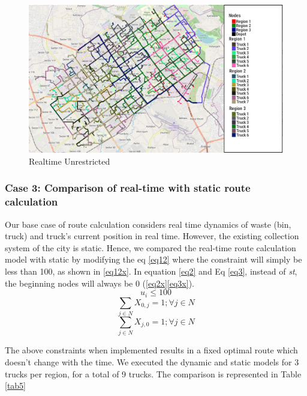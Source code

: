 \documentclass[12pt]{article}
\begin{document}
 

\begin{figure}[H]
    \centering
    \includegraphics[scale=0.4]{Dynamic_weighted_unrestricted.png} %
    \caption{Realtime Unrestricted}\label{fig2}
\end{figure}


\subsubsection*{Case 3: Comparison of real-time with static route calculation}

Our base case of route calculation considers real time dynamics of waste (bin, truck) and truck's current position in real time. However, the existing collection system of the city is static. Hence, we compared the real-time route calculation model with static by modifying the eq \eqref{eq12} where the constraint will simply be less than 100, as shown in \eqref{eq12x}. In equation \eqref{eq2} and Eq \eqref{eq3}, instead of \textit{st}, the beginning nodes will always be 0 (\eqref{eq2x}\eqref{eq3x}). 
\begin{equation}\label{eq12x}
    u_i\le 100
\end{equation}
\begin{equation}\label{eq2x}
    \sum_{j\in N}X_{0,j}=1 ; \forall j \in N
\end{equation}
\begin{equation}\label{eq3x}
    \sum_{j\in N}X_{j,0}=1 ; \forall j \in N
\end{equation}

The above constraints when implemented results in a fixed optimal route which doesn't change with the time. We executed the dynamic and static models for 3 trucks per region, for a total of 9 trucks. The comparison is represented in Table \ref{tab5}
\end{document}

